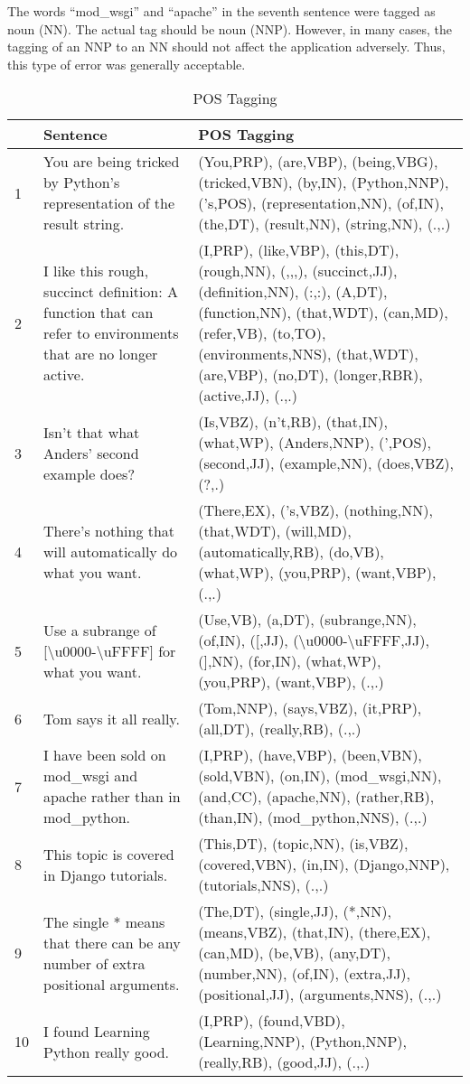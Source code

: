 The words ``mod\_wsgi'' and ``apache'' in the seventh sentence were tagged as
noun (NN). The actual tag should be noun (NNP). However, in many cases, the
tagging of an NNP to an NN should not affect the application adversely. Thus,
this type of error was generally acceptable.

\begin{table}
\caption{POS Tagging}\label{pos}
\begin{tabu}{X[0.1,l]X[1,l]X[2,l]}
    & \textbf{Sentence} & \textbf{POS Tagging} \\
     & You are being tricked by Python's representation of the result
    string. &
    (You,PRP), (are,VBP), (being,VBG), (tricked,VBN), (by,IN), (Python,NNP),
    ('s,POS), (representation,NN), (of,IN), (the,DT), (result,NN), 
    (string,NN), (.,.) \\
    2 & I like this rough, succinct definition: A function that can refer to 
    environments that are no longer active. &
    (I,PRP), (like,VBP), (this,DT), (rough,NN), (,,,), (succinct,JJ),
    (definition,NN), (:,:), (A,DT), (function,NN), (that,WDT), (can,MD),
    (refer,VB), (to,TO), (environments,NNS), (that,WDT), (are,VBP), (no,DT),
    (longer,RBR), (active,JJ), (.,.) \\
    3 & Isn't that what Anders' second example does? &
    (Is,VBZ), (n't,RB), (that,IN), (what,WP), (Anders,NNP), (',POS),
    (second,JJ), (example,NN), (does,VBZ), (?,.) \\
    4 & There's nothing that will automatically do what you want. & 
    (There,EX), ('s,VBZ), (nothing,NN), (that,WDT), (will,MD),
    (automatically,RB), (do,VB), (what,WP), (you,PRP), (want,VBP), (.,.) \\
    5 & Use a subrange of [\textbackslash{}u0000-\textbackslash{}uFFFF] for
    what you want. & 
    (Use,VB), (a,DT), (subrange,NN), (of,IN), ([,JJ),
    (\textbackslash{}u0000-\textbackslash{}uFFFF,JJ), (],NN),
    (for,IN), (what,WP), (you,PRP), (want,VBP), (.,.) \\
    6 & Tom says it all really. &
    (Tom,NNP), (says,VBZ), (it,PRP), (all,DT), (really,RB), (.,.) \\
    7 & I have been sold on mod\_wsgi and apache rather than in mod\_python. &
    (I,PRP), (have,VBP), (been,VBN), (sold,VBN), (on,IN), (mod\_wsgi,NN),
    (and,CC), (apache,NN), (rather,RB), (than,IN), (mod\_python,NNS), (.,.) \\
    8 & This topic is covered in Django tutorials. &
    (This,DT), (topic,NN), (is,VBZ), (covered,VBN), (in,IN), (Django,NNP),
    (tutorials,NNS), (.,.) \\
    9 & The single * means that there can be any number of extra positional
    arguments. &
    (The,DT), (single,JJ), (*,NN), (means,VBZ), (that,IN), (there,EX), (can,MD),
    (be,VB), (any,DT), (number,NN), (of,IN), (extra,JJ), (positional,JJ),
    (arguments,NNS), (.,.) \\
    10 & I found Learning Python really good. &
    (I,PRP), (found,VBD), (Learning,NNP), (Python,NNP), (really,RB), (good,JJ),
    (.,.) \\    
\end{tabu} 
\end{table}

